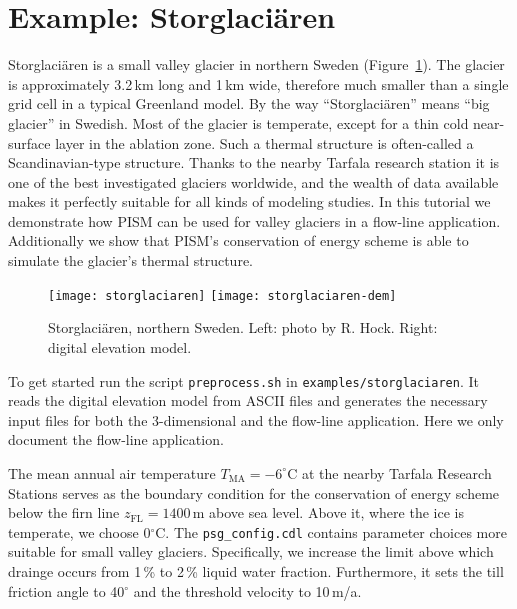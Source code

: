
\section{Example: Storglaci{\"a}ren}\label{sec:storglaciaren} 

Storglaci{\"a}ren is a small valley glacier in northern Sweden (Figure~\ref{fig:storglaciaren}). The glacier is approximately 3.2\,km long and 1\,km wide, therefore much smaller than a single grid cell in a typical Greenland model. By the way ``Storglaci{\"a}ren'' means ``big glacier'' in Swedish. Most of the glacier is temperate, except for a thin cold near-surface layer in the ablation zone. Such a thermal structure is often-called a Scandinavian-type structure. Thanks to the nearby Tarfala research station it is one of the best investigated glaciers worldwide, and the wealth of data available makes it perfectly suitable for all kinds of modeling studies. In this tutorial we demonstrate how PISM can be used for valley glaciers in a flow-line application. Additionally we show that PISM's conservation of energy scheme is able to simulate the glacier's thermal structure.

\begin{figure}[ht]
  \centering
  \texttt{[image: storglaciaren]}\qquad
  \texttt{[image: storglaciaren-dem]}
  \caption{Storglaci{\"a}ren, northern Sweden. Left: photo by R. Hock. Right: digital elevation model.}
  \label{fig:storglaciaren}
\end{figure}

To get started run the script \texttt{preprocess.sh} in \texttt{examples/storglaciaren}. It reads the digital elevation model from ASCII files and generates the necessary input files for both the 3-dimensional and the flow-line application. Here we only document the flow-line application.

The mean annual air temperature $T_{\mathrm{MA}}=-6^{\circ}$C at the nearby Tarfala Research Stations serves as the boundary condition for the conservation of energy scheme below the firn line $z_{\textrm{FL}} = 1400$\,m above sea level. Above it, where the ice is temperate, we choose 0$^{\circ}$C. The \texttt{psg_config.cdl} contains parameter choices more suitable for small valley glaciers. Specifically, we increase the limit above which drainge occurs from 1\,\% to 2\,\% liquid water fraction. Furthermore, it sets the till friction angle to 40$^{\circ}$ and the threshold velocity to 10\,m/a.


